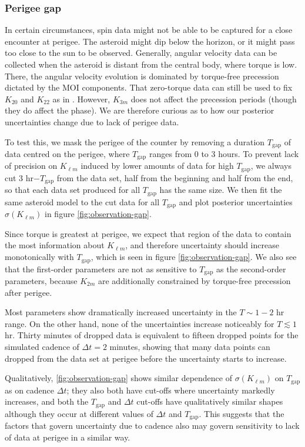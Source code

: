 \documentclass[fleqn,usenatbib]{mnras}
\begin{document}
\subsubsection{Perigee gap}
\label{sec:scan-gap}
In certain circumstances, spin data might not be able to be captured for a close encounter at perigee. The asteroid might dip below the horizon, or it might pass too close to the sun to be observed. Generally, angular velocity data can be collected when the asteroid is distant from the central body, where torque is low. There, the angular velocity evolution is dominated by torque-free precession dictated by the MOI components. That zero-torque data can still be used to fix $K_{20}$ and $K_{22}$ as in \cite{MOSKOVITZ2020113519}. However, $K_{3m}$ does not affect the precession periods (though they do affect the phase). We are therefore curious as to how our posterior uncertainties change due to lack of perigee data.

To test this, we mask the perigee of the counter by removing a duration $T_\text{gap}$ of data centred on the perigee, where $T_\text{gap}$ ranges from 0 to 3 hours. To prevent lack of precision on $K_{\ell m}$ induced by lower amounts of data for high $T_\text{gap}$, we always cut 3 hr$-T_\text{gap}$ from the data set, half from the beginning and half from the end, so that each data set produced for all $T_\text{gap}$ has the same size. We then fit the same asteroid model to the cut data for all $T_\text{gap}$ and plot posterior uncertainties $\sigma(K_{\ell m})$ in figure \ref{fig:observation-gap}.

Since torque is greatest at perigee, we expect that region of the data to contain the most information about $K_{\ell m}$, and therefore uncertainty should increase monotonically with $T_\text{gap}$, which is seen in figure \ref{fig:observation-gap}. We also see that the first-order parameters are not as sensitive to $T_\text{gap}$ as the second-order parameters, because $K_{2m}$ are additionally constrained by torque-free precession after perigee.

Most parameters show dramatically increased uncertainty in the $T \sim 1-2$ hr range. On the other hand, none of the uncertainties increase noticeably for $T \lesssim 1$ hr. Thirty minutes of dropped data is equivalent to fifteen dropped points for the simulated cadence of $\Delta t = 2$ minutes, showing that many data points can dropped from the data set at perigee before the uncertainty starts to increase.

Qualitatively, \ref{fig:observation-gap} shows similar dependence of $\sigma(K_{\ell m})$ on $T_\text{gap}$ as on cadence $\Delta t$; they also both have cut-offs where uncertainty markedly increases, and both the $T_\text{gap}$ and $\Delta t$ cut-offs have qualitatively similar shapes although they occur at different values of $\Delta t$ and $T_\text{gap}$. This suggests that the factors that govern uncertainty due to cadence also may govern sensitivity to lack of data at perigee in a similar way.
\end{document}
